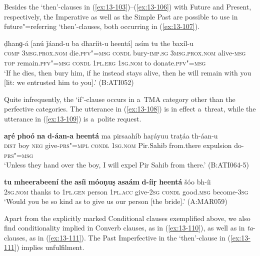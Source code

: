 Besides the `then'-clauses in (\ref{ex:13-103})--(\ref{ex:13-106}) with Future and Present, respectively, the Imperative as well as the Simple Past are possible to use in future"=referring `then'-clauses, both occurring in (\ref{ex:13-107}).

\begin{exe}
\ex
\label{ex:13-107}
 ḍhanɡ-á  [anú ǰáand-u ba dharíit-u
  heentá]  asím tu the baxíl-u\\
\textsc{comp} \textsc{3msg.prox.nom} die.\textsc{pfv"=msg} \textsc{condl} bury-\textsc{imp.sg}  \textsc{3msg.prox.nom} alive-\textsc{msg} \textsc{top} remain.\textsc{pfv"=msg} \textsc{condl}  \textsc{1pl.erg} \textsc{1sg.nom} to donate.\textsc{pfv"=msg}\\
\glt `If he dies, then bury him, if he instead stays alive, then he will remain with you [lit: we entrusted him to you].' (B:ATI052) 
\end{exe}

Quite infrequently, the `if'-clause occurs in a~TMA category other than the perfective categories. The utterance in (\ref{ex:13-108}) is in effect a~threat, while the utterance in (\ref{ex:13-109}) is a~polite request.

\begin{exe}
\ex
\label{ex:13-108}
\gll \textbf{aṛé} \textbf{phoó} \textbf{na} \textbf{d-áan-a} \textbf{heentá} ma  pirsaahíb haṛáyuu traṭáa th-áan-u \\
 \textsc{dist}{\protect\footnotemark} boy \textsc{neg} give-\textsc{prs"=mpl} \textsc{condl} \textsc{1sg.nom}  Pir.Sahib  from.there expulsion do-\textsc{prs"=msg} \\
\glt `Unless they hand over the boy, I will expel Pir Sahib from there.' (B:ATI064-5)

\ex
\label{ex:13-109}
\gll \textbf{tu} \textbf{mheerabeení} \textbf{the} \textbf{asíi} \textbf{móoṇuṣ} \textbf{asaám} \textbf{d-íiṛ} \textbf{ heentá} šóo bh-íi  \\
\textsc{2sg.nom} thanks to \textsc{1pl.gen} person \textsc{1pl.acc} give-\textsc{2sg}  \textsc{condl} good.\textsc{msg} become-\textsc{3sg} \\
\glt `Would you be so kind as to give us our person [the bride].' (A:MAR059) 
\end{exe}



Apart from the explicitly marked Conditional clauses exemplified above, we also find conditionality implied in Converb clauses, as in (\ref{ex:13-110}), as well as in \textit{ta}-clauses, as in (\ref{ex:13-111}). The Past Imperfective in the `then'-clause in (\ref{ex:13-111}) implies unfulfilment.

